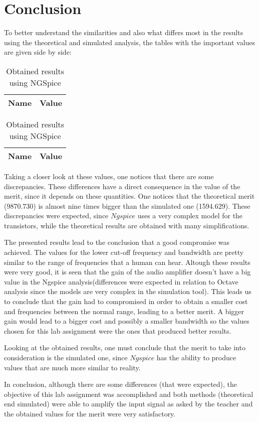 \section{Conclusion}
\label{sec:conclusion}

\par To better understand the similarities and also what differs most in the results using the theoretical and simulated analysis, the tables with the important values are given side by side:



\begin{table}[ht]
\parbox{.45\linewidth}{
  \centering
  \begin{tabular}{|l|r|}
    \hline    
    {\bf Name} & {\bf Value} \\ \hline
    
  \end{tabular}
  \caption{Obtained results using Octave}} 
\parbox{.45\linewidth}{
 \centering
  \begin{tabular}{|l|r|}
    \hline    
    {\bf Name} & {\bf Value} \\ \hline
    
  \end{tabular}
  \caption{Obtained results using NGSpice}}
\end{table}

\par Taking a closer look at these values, one notices that there are some discrepancies. These differences have a direct consequence in the value of the merit, since it depends on these quantities. One notices that the theoretical merit (9870.730) is almost nine times bigger than the simulated one (1594.629). These discrepancies were expected, since $Ngspice$ uses a very complex model for the transistors, while the theoretical results are obtained with many simplifications.
\par The presented results lead to the conclusion that a good compromise was achieved. The values for the lower cut-off frequency and bandwidth are pretty similar to the range of frequencies that a human can hear. Altough these results were very good, it is seen that the gain of the audio amplifier doesn't have a big value in the Ngspice analysis(differences were expected in relation to Octave analysis since the models are very complex in the simulation tool). This leads us to conclude that the gain had to compromised in order to obtain a smaller cost and frequencies between the normal range, leading to a better merit. A bigger gain would lead to a bigger cost and possibly a smaller bandwidth so the values chosen for this lab assignment were the ones that produced better results.
\par Looking at the obtained results, one must conclude that the merit to take into consideration is the simulated one, since $Ngspice$ has the ability to produce values that are much more similar to reality.
\par In conclusion, although there are some differences (that were expected), the objective of this lab assignment was accomplished and both methods (theoretical end simulated) were able to amplify the input signal as asked by the teacher and the obtained values for the merit were very satisfactory.
